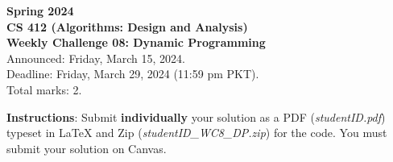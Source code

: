 \documentclass[a4paper]{exam}
\begin{document}
\begin{center}
{\Large \textbf{Spring 2024}}\vspace{1.0em}\\
{\Large \textbf{CS 412 (Algorithms: Design and Analysis)}}\vspace{1.0em}\\
{\Large \textbf{Weekly Challenge 08: Dynamic Programming}}\vspace{1.0em}\\
{\Large Announced: Friday, March 15, 2024.}\\
\vspace{.25em}
{\Large Deadline: Friday, March 29, 2024 (11:59 pm PKT).}\\ 
\vspace{.3em}
{\Large Total marks: 2.}
\vspace{.5em}\\
\end{center}
\textbf{Instructions}: Submit \textbf{individually} your solution as a PDF (\textit{studentID.pdf}) typeset in LaTeX and Zip (\textit{studentID\_WC8\_DP.zip}) for the code. You must submit your solution on Canvas.
\end{document}
